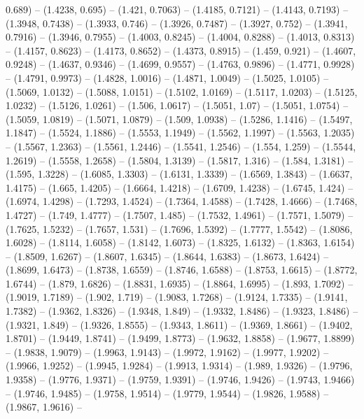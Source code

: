 {   0.689) -- (1.4238, 0.695) -- (1.421, 0.7063) -- (1.4185, 0.7121) -- (1.4143, 
  0.7193) -- (1.3948, 0.7438) -- (1.3933, 0.746) -- (1.3926, 0.7487) -- (1.3927,
   0.752) -- (1.3941, 0.7916) -- (1.3946, 0.7955) -- (1.4003, 0.8245) -- 
  (1.4004, 0.8288) -- (1.4013, 0.8313) -- (1.4157, 0.8623) -- (1.4173, 0.8652) 
  -- (1.4373, 0.8915) -- (1.459, 0.921) -- (1.4607, 0.9248) -- (1.4637, 0.9346) 
  -- (1.4699, 0.9557) -- (1.4763, 0.9896) -- (1.4771, 0.9928) -- (1.4791, 
  0.9973) -- (1.4828, 1.0016) -- (1.4871, 1.0049) -- (1.5025, 1.0105) -- 
  (1.5069, 1.0132) -- (1.5088, 1.0151) -- (1.5102, 1.0169) -- (1.5117, 1.0203) 
  -- (1.5125, 1.0232) -- (1.5126, 1.0261) -- (1.506, 1.0617) -- (1.5051, 1.07) 
  -- (1.5051, 1.0754) -- (1.5059, 1.0819) -- (1.5071, 1.0879) -- (1.509, 1.0938)
   -- (1.5286, 1.1416) -- (1.5497, 1.1847) -- (1.5524, 1.1886) -- (1.5553, 
  1.1949) -- (1.5562, 1.1997) -- (1.5563, 1.2035) -- (1.5567, 1.2363) -- 
  (1.5561, 1.2446) -- (1.5541, 1.2546) -- (1.554, 1.259) -- (1.5544, 1.2619) -- 
  (1.5558, 1.2658) -- (1.5804, 1.3139) -- (1.5817, 1.316) -- (1.584, 1.3181) -- 
  (1.595, 1.3228) -- (1.6085, 1.3303) -- (1.6131, 1.3339) -- (1.6569, 1.3843) --
   (1.6637, 1.4175) -- (1.665, 1.4205) -- (1.6664, 1.4218) -- (1.6709, 1.4238) 
  -- (1.6745, 1.424) -- (1.6974, 1.4298) -- (1.7293, 1.4524) -- (1.7364, 1.4588)
   -- (1.7428, 1.4666) -- (1.7468, 1.4727) -- (1.749, 1.4777) -- (1.7507, 1.485)
   -- (1.7532, 1.4961) -- (1.7571, 1.5079) -- (1.7625, 1.5232) -- (1.7657, 
  1.531) -- (1.7696, 1.5392) -- (1.7777, 1.5542) -- (1.8086, 1.6028) -- (1.8114,
   1.6058) -- (1.8142, 1.6073) -- (1.8325, 1.6132) -- (1.8363, 1.6154) -- 
  (1.8509, 1.6267) -- (1.8607, 1.6345) -- (1.8644, 1.6383) -- (1.8673, 1.6424) 
  -- (1.8699, 1.6473) -- (1.8738, 1.6559) -- (1.8746, 1.6588) -- (1.8753, 
  1.6615) -- (1.8772, 1.6744) -- (1.879, 1.6826) -- (1.8831, 1.6935) -- (1.8864,
   1.6995) -- (1.893, 1.7092) -- (1.9019, 1.7189) -- (1.902, 1.719) -- (1.9083, 
  1.7268) -- (1.9124, 1.7335) -- (1.9141, 1.7382) -- (1.9362, 1.8326) -- 
  (1.9348, 1.849) -- (1.9332, 1.8486) -- (1.9323, 1.8486) -- (1.9321, 1.849) -- 
  (1.9326, 1.8555) -- (1.9343, 1.8611) -- (1.9369, 1.8661) -- (1.9402, 1.8701) 
  -- (1.9449, 1.8741) -- (1.9499, 1.8773) -- (1.9632, 1.8858) -- (1.9677, 
  1.8899) -- (1.9838, 1.9079) -- (1.9963, 1.9143) -- (1.9972, 1.9162) -- 
  (1.9977, 1.9202) -- (1.9966, 1.9252) -- (1.9945, 1.9284) -- (1.9913, 1.9314) 
  -- (1.989, 1.9326) -- (1.9796, 1.9358) -- (1.9776, 1.9371) -- (1.9759, 1.9391)
   -- (1.9746, 1.9426) -- (1.9743, 1.9466) -- (1.9746, 1.9485) -- (1.9758, 
  1.9514) -- (1.9779, 1.9544) -- (1.9826, 1.9588) -- (1.9867, 1.9616) -- 
}

